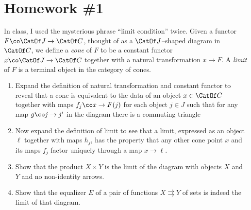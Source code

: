 
\section{Homework \#1}

\begin{problem}
In class, I used the mysterious phrase ``limit condition'' twice.  Given a functor $F\co \CatOf J \to \CatOf C$, thought of as a $\CatOf J$--shaped diagram in $\CatOf C$, we define a \textit{cone} of $F$ to be a constant functor $x\co \CatOf J \to \CatOf C$ together with a natural transformation $x \to F$.  A \textit{limit} of $F$ is a terminal object in the category of cones.
\begin{enumerate}
    \item Expand the definition of natural transformation and constant functor to reveal that a cone is equivalent to the data of an object $x \in \CatOf C$ together with maps $f_j\co x \to F(j)$ for each object $j \in J$ such that for any map $g\co j \to j'$ in the diagram there is a commuting triangle
    \begin{center}
    \end{center}
    \item Now expand the definition of limit to see that a limit, expressed as an object $\ell$ together with maps $h_j$, has the property that any other cone point $x$ and its maps $f_j$ factor uniquely through a map $x \to \ell$.
    \item Show that the product $X \times Y$ is the limit of the diagram with objects $X$ and $Y$ and no non-identity arrows.
    \item Show that the equalizer $E$ of a pair of functions $X \rightrightarrows Y$ of sets is indeed the limit of that diagram.
\end{enumerate}
\end{problem}

